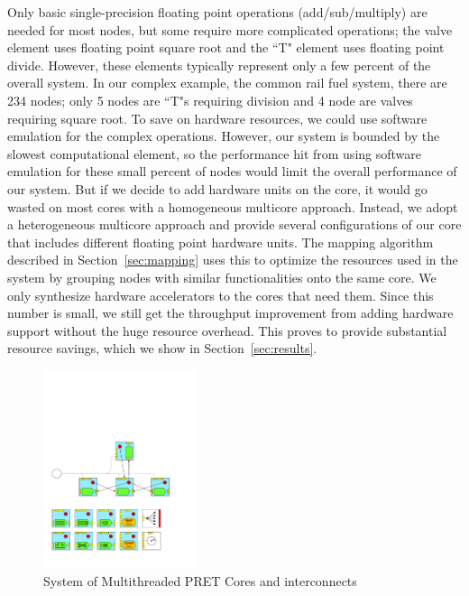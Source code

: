 Only basic single-precision floating point operations (add/sub/multiply) are needed for most nodes, but some require more complicated operations;  
the valve element uses floating point square root and the ``T" element uses floating point divide.
However, these elements typically represent only a few percent of the overall system.  
In our complex example, the common rail fuel system, there are 234 nodes; only 5 nodes are ``T"s requiring division and 4 node are valves requiring square root.
To save on hardware resources, we could use software emulation for the complex operations. 
However, our system is bounded by the slowest computational element, so the performance hit from using software emulation for these small percent of nodes would limit the overall performance of our system. 
But if we decide to add hardware units on the core, it would go wasted on most cores with a homogeneous multicore approach.
Instead, we adopt a heterogeneous multicore approach and provide several configurations of our core that includes different floating point hardware units.
The mapping algorithm described in Section~\ref{sec:mapping} uses this to optimize the resources used in the system by grouping nodes with similar functionalities onto the same core. 
We only synthesize hardware accelerators to the cores that need them. 
Since this number is small, we still get the throughput improvement from adding hardware support without the huge resource overhead. 
This proves to provide substantial resource savings, which we show in Section~\ref{sec:results}.  

\begin{figure}
\centering
\includegraphics[page=8, width=0.4\textwidth]{./figs/1dcfd/ElementalProcessors.pdf}
\caption{System of Multithreaded PRET Cores and interconnects}
\label{ARM_Cores}
\end{figure}

